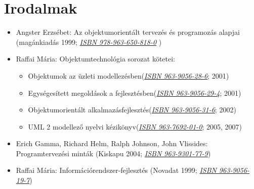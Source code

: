\documentclass[]{thesis-ekf}
\theoremstyle{definition}
\begin{document}
	\chapter{Irodalmak}
	\begin{itemize}
		\item Angster Erzsébet: Az objektumorientált tervezés és programozás alapjai (magánkiadás 1999; \href{https://hu.wikipedia.org/wiki/Speci\%C3\%A1lis:K\%C3\%B6nyvforr\%C3\%A1sok/9789636508180}{\textit{ISBN 978-963-650-818-0}} )
		\item Raffai Mária: Objektumtechnológia sorozat kötetei:
		\begin{itemize}
			\item Objektumok az üzleti modellezésben(\href{https://hu.wikipedia.org/wiki/Speci\%C3\%A1lis:K\%C3\%B6nyvforr\%C3\%A1sok/9639056286}{\textit{ISBN 963-9056-28-6}}; 2001)
			\item Egységesített megoldások a fejlesztésben(\href{https://hu.wikipedia.org/wiki/Speci\%C3\%A1lis:K\%C3\%B6nyvforr\%C3\%A1sok/9639056294}{\textit{ISBN 963-9056-29-4}}; 2001)
			\item Objektumorientált alkalmazásfejlesztés(\href{https://hu.wikipedia.org/wiki/Speci\%C3\%A1lis:K\%C3\%B6nyvforr\%C3\%A1sok/9639056316}{\textit{ISBN 963-9056-31-6}}; 2002)
			\item UML 2 modellező nyelvi kézikönyv(\href{https://hu.wikipedia.org/wiki/Speci\%C3\%A1lis:K\%C3\%B6nyvforr\%C3\%A1sok/9637692010}{\textit{ISBN 963-7692-01-0}}; 2005, 2007)
		\end{itemize}
		\item Erich Gamma, Richard Helm, Ralph Johnson, John Vlissides: Programtervezési minták (Kiskapu 2004; \href{https://hu.wikipedia.org/wiki/Speci\%C3\%A1lis:K\%C3\%B6nyvforr\%C3\%A1sok/9639301779}{\textit{ISBN 963-9301-77-9}})
		\item Raffai Mária: Információrendszer-fejlesztés (Novadat 1999; \href{https://hu.wikipedia.org/wiki/Speci\%C3\%A1lis:K\%C3\%B6nyvforr\%C3\%A1sok/9639056197}{\textit{ISBN 963-9056-19-7}})
	\end{itemize}
	
\end{document}
